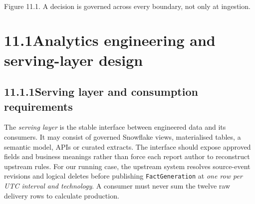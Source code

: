 \documentclass[11pt,twoside]{article}
\newcommand{\topic}[2]{\subsection*{#1\quad #2}}
\begin{document}
\begin{center}\\{\fontsize{8}{9}\selectfont\color{inkgray}Figure 11.1. A decision is governed across every boundary, not only at ingestion.}\end{center}
\newpage
\section*{11.1\quad Analytics engineering and serving-layer design}
\topic{11.1.1}{Serving layer and consumption requirements}
The \emph{serving layer} is the stable interface between engineered data and its consumers. It may consist of governed Snowflake views, materialised tables, a semantic model, APIs or curated extracts. The interface should expose approved fields and business meanings rather than force each report author to reconstruct upstream rules. For our running case, the upstream system resolves source-event revisions and logical deletes before publishing \texttt{FactGeneration} at \emph{one row per UTC interval and technology}. A consumer must never sum the twelve raw delivery rows to calculate production.
\end{document}
